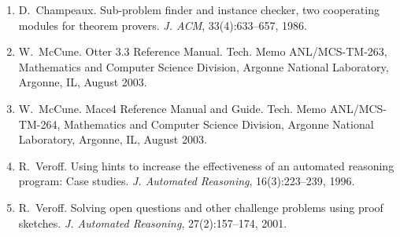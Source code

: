 \begin{enumerate}

\item
D.~Champeaux.
 Sub-problem finder and instance checker, two cooperating modules for
  theorem provers.
 {\em J. ACM}, 33(4):633--657, 1986.

\item
W.~McCune.
 Otter 3.3 {R}eference {M}anual.
 Tech. Memo ANL/MCS-TM-263, Mathematics and Computer Science Division,
  Argonne National Laboratory, Argonne, IL, August 2003.

\item
W.~McCune.
 Mace4 {R}eference {M}anual and {G}uide.
 Tech. Memo ANL/MCS-TM-264, Mathematics and Computer Science Division,
  Argonne National Laboratory, Argonne, IL, August 2003.

\item
R.~Veroff.
 Using hints to increase the effectiveness of an automated reasoning
  program: Case studies.
 {\em J. Automated Reasoning}, 16(3):223--239, 1996.

\item
R.~Veroff.
 Solving open questions and other challenge problems using proof
  sketches.
 {\em J. Automated Reasoning}, 27(2):157--174, 2001.

\end{enumerate}
